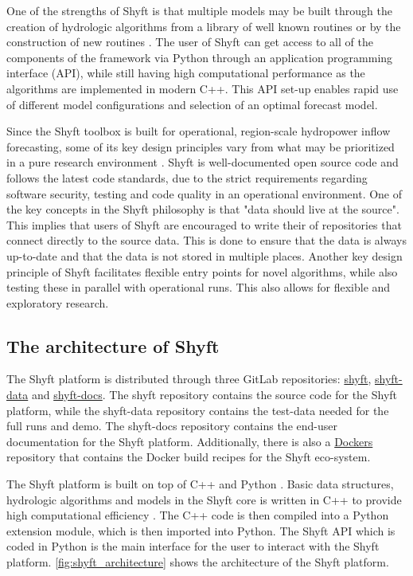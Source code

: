One of the strengths of Shyft is that multiple models may be built through the creation of hydrologic algorithms from a library of well known routines or by the construction of new routines \autocite{burkhartShyftV4Framework2021}. The user of Shyft can get access to all of the components of the framework via Python through an application programming interface (API), while still having high computational performance as the algorithms are implemented in modern C++. This API set-up enables rapid use of different model configurations and selection of an optimal forecast model. 

Since the Shyft toolbox is built for operational, region-scale hydropower inflow forecasting, some of its key design principles vary from what may be prioritized in a pure research environment \autocite{burkhartShyftV4Framework2021}. Shyft is well-documented open source code and follows the latest code standards, due to the strict requirements regarding software security, testing and code quality in an operational environment. One of the key concepts in the Shyft philosophy is that "data should live at the source". This implies that users of Shyft are encouraged to write their of repositories that connect directly to the source data. This is done to ensure that the data is always up-to-date and that the data is not stored in multiple places. Another key design principle of Shyft facilitates flexible entry points for novel algorithms, while also testing these in parallel with operational runs. This also allows for flexible and exploratory research.

\subsection{The architecture of Shyft}

The Shyft platform is distributed through three GitLab repositories: \href{https://gitlab.com/shyft-os/shyft}{shyft}, \href{https://gitlab.com/shyft-os/shyft-data}{shyft-data} and \href{https://gitlab.com/shyft-os/shyft-doc}{shyft-docs}. The shyft repository contains the source code for the Shyft platform, while the shyft-data repository contains the test-data needed for the full runs and demo. The shyft-docs repository contains the end-user documentation for the Shyft platform. Additionally, there is also a \href{https://gitlab.com/shyft-os/dockers}{Dockers} repository that contains the Docker build recipes for the Shyft eco-system.

The Shyft platform is built on top of C++ and Python \autocite{burkhartShyftV4Framework2021}. Basic data structures, hydrologic algorithms and models in the Shyft core is written in C++ to provide high computational efficiency \autocite{zehraComparativeAnalysisPython2020}. The C++ code is then compiled into a Python extension module, which is then imported into Python. The Shyft API which is coded in Python is the main interface for the user to interact with the Shyft platform.  \autoref{fig:shyft_architecture} shows the architecture of the Shyft platform. 

